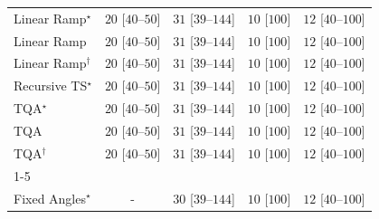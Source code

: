 \begin{tabular}{l|cccc|}
Linear Ramp$^\star$ & {\cellcolor[HTML]{E8F6E4}} \color[HTML]{000000} $20$ [$40$--$50$] & {\cellcolor[HTML]{DCF2D7}} \color[HTML]{000000} $31$ [$39$--$144$] & {\cellcolor[HTML]{F0F9ED}} \color[HTML]{000000} $10$ [$100$] & {\cellcolor[HTML]{EFF9EB}} \color[HTML]{000000} $12$ [$40$--$100$] \\
Linear Ramp & {\cellcolor[HTML]{E8F6E4}} \color[HTML]{000000} $20$ [$40$--$50$] & {\cellcolor[HTML]{DCF2D7}} \color[HTML]{000000} $31$ [$39$--$144$] & {\cellcolor[HTML]{F0F9ED}} \color[HTML]{000000} $10$ [$100$] & {\cellcolor[HTML]{EFF9EB}} \color[HTML]{000000} $12$ [$40$--$100$] \\
Linear Ramp$^\dagger$ & {\cellcolor[HTML]{E8F6E4}} \color[HTML]{000000} $20$ [$40$--$50$] & {\cellcolor[HTML]{DCF2D7}} \color[HTML]{000000} $31$ [$39$--$144$] & {\cellcolor[HTML]{F0F9ED}} \color[HTML]{000000} $10$ [$100$] & {\cellcolor[HTML]{EFF9EB}} \color[HTML]{000000} $12$ [$40$--$100$] \\
Recursive TS$^\star$ & {\cellcolor[HTML]{E8F6E4}} \color[HTML]{000000} $20$ [$40$--$50$] & {\cellcolor[HTML]{DCF2D7}} \color[HTML]{000000} $31$ [$39$--$144$] & {\cellcolor[HTML]{F0F9ED}} \color[HTML]{000000} $10$ [$100$] & {\cellcolor[HTML]{EFF9EB}} \color[HTML]{000000} $12$ [$40$--$100$] \\
TQA$^\star$ & {\cellcolor[HTML]{E8F6E4}} \color[HTML]{000000} $20$ [$40$--$50$] & {\cellcolor[HTML]{DCF2D7}} \color[HTML]{000000} $31$ [$39$--$144$] & {\cellcolor[HTML]{F0F9ED}} \color[HTML]{000000} $10$ [$100$] & {\cellcolor[HTML]{EFF9EB}} \color[HTML]{000000} $12$ [$40$--$100$] \\
TQA & {\cellcolor[HTML]{E8F6E4}} \color[HTML]{000000} $20$ [$40$--$50$] & {\cellcolor[HTML]{DCF2D7}} \color[HTML]{000000} $31$ [$39$--$144$] & {\cellcolor[HTML]{F0F9ED}} \color[HTML]{000000} $10$ [$100$] & {\cellcolor[HTML]{EFF9EB}} \color[HTML]{000000} $12$ [$40$--$100$] \\
TQA$^\dagger$ & {\cellcolor[HTML]{E8F6E4}} \color[HTML]{000000} $20$ [$40$--$50$] & {\cellcolor[HTML]{DCF2D7}} \color[HTML]{000000} $31$ [$39$--$144$] & {\cellcolor[HTML]{F0F9ED}} \color[HTML]{000000} $10$ [$100$] & {\cellcolor[HTML]{EFF9EB}} \color[HTML]{000000} $12$ [$40$--$100$] \\
\cline{1-5}
\multicolumn{5}{c}{\rule{0pt}{8pt}PP} \\
\midrule
Fixed Angles$^\star$ & {\cellcolor[HTML]{000000}} \color[HTML]{F1F1F1} {\cellcolor{white}} \color{black} - & {\cellcolor[HTML]{DDF2D8}} \color[HTML]{000000} $30$ [$39$--$144$] & {\cellcolor[HTML]{F0F9ED}} \color[HTML]{000000} $10$ [$100$] & {\cellcolor[HTML]{EFF9EB}} \color[HTML]{000000} $12$ [$40$--$100$] \\

\end{tabular}
